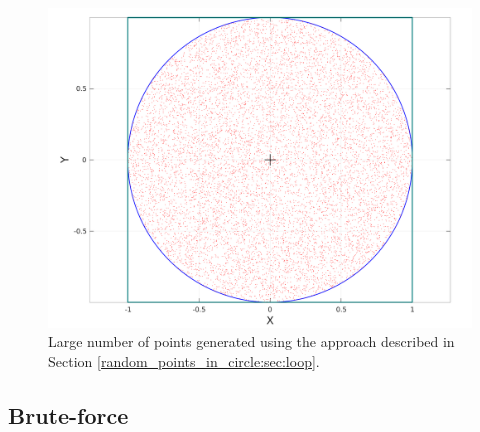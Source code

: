 \begin{figure}
	\label{fig:random_points_in_cirle:loop}
	\centering
	\includegraphics[scale=0.3]{sources/random_points_in_circle/images/loop_points}
	\caption{Large number of points generated using the approach described in Section \ref{random_points_in_circle:sec:loop}.}
\end{figure}

\subsection{Brute-force}
\label{random_points_in_circle:sec:bruteforce}



